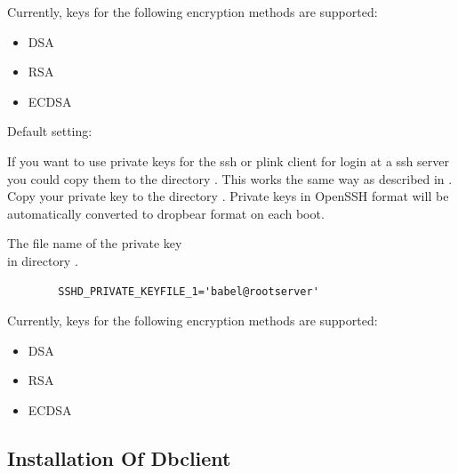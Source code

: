 \begin{description}
Currently, keys for the following encryption methods are supported:
  \begin{itemize}
  \item DSA
  \item RSA
  \item ECDSA
  \end{itemize}


  Default setting: \\ 

  If you want to use private keys for the ssh or plink client for login 
  at a ssh server you could copy them to the directory . 
  This works the same way as described in . Copy 
  your private key to the directory . Private keys 
  in OpenSSH format will be automatically converted to dropbear format on each boot. 
  

  The file name of the private key \\ in directory . 
  
\begin{example}
\begin{verbatim}
        SSHD_PRIVATE_KEYFILE_1='babel@rootserver'
\end{verbatim}
\end{example}

Currently, keys for the following encryption methods are supported:
  \begin{itemize}
  \item DSA
  \item RSA
  \item ECDSA
  \end{itemize}

\end{description}

\subsection {Installation Of Dbclient}

